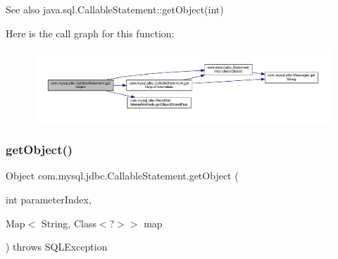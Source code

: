 \begin{DoxySeeAlso}{See also}
java.\+sql.\+Callable\+Statement\+::get\+Object(int) 
\end{DoxySeeAlso}
Here is the call graph for this function\+:\nopagebreak
\begin{figure}[H]
\begin{center}
\leavevmode
\includegraphics[width=350pt]{classcom_1_1mysql_1_1jdbc_1_1_callable_statement_aab2faed459ce07e17b7c4c6871d7ffb4_cgraph}
\end{center}
\end{figure}
\mbox{\label{classcom_1_1mysql_1_1jdbc_1_1_callable_statement_a5a628d28a025afcd44718d58d26e6c05}} 
\subsubsection{\texorpdfstring{get\+Object()}{getObject()}\hspace{0.1cm}{\footnotesize\ttfamily [2/4]}}
{\footnotesize\ttfamily Object com.\+mysql.\+jdbc.\+Callable\+Statement.\+get\+Object (\begin{DoxyParamCaption}\item[{int}]{parameter\+Index,  }\item[{Map$<$ String, Class$<$?$>$$>$}]{map }\end{DoxyParamCaption}) throws S\+Q\+L\+Exception}

